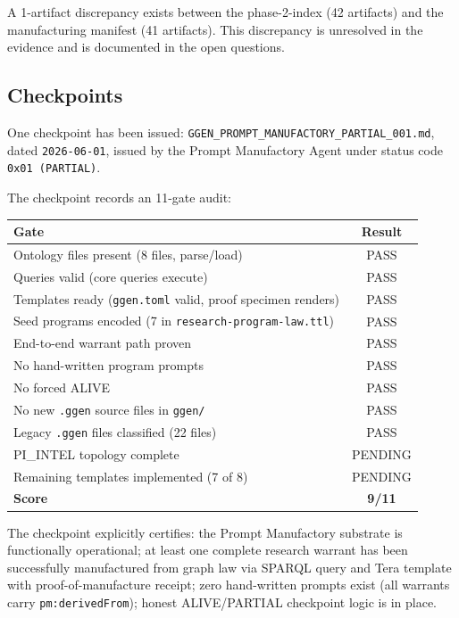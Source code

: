 A 1-artifact discrepancy exists between the phase-2-index (42 artifacts) and the
manufacturing manifest (41 artifacts). This discrepancy is unresolved in the evidence
and is documented in the open questions.

\subsection{Checkpoints}
\label{sec:research-prompt-manufactory-evidence-checkpoints}

One checkpoint has been issued: \texttt{GGEN\_PROMPT\_MANUFACTORY\_PARTIAL\_001.md},
dated \texttt{2026-06-01}, issued by the Prompt Manufactory Agent under status code
\texttt{0x01 (PARTIAL)}.

The checkpoint records an 11-gate audit:

\begin{center}
\begin{tabular}{|l|c|}
\hline
\textbf{Gate} & \textbf{Result} \\
\hline
Ontology files present (8 files, parse/load) & PASS \\
Queries valid (core queries execute) & PASS \\
Templates ready (\texttt{ggen.toml} valid, proof specimen renders) & PASS \\
Seed programs encoded (7 in \texttt{research-program-law.ttl}) & PASS \\
End-to-end warrant path proven & PASS \\
No hand-written program prompts & PASS \\
No forced ALIVE & PASS \\
No new \texttt{.ggen} source files in \texttt{ggen/} & PASS \\
Legacy \texttt{.ggen} files classified (22 files) & PASS \\
PI\_INTEL topology complete & PENDING \\
Remaining templates implemented (7 of 8) & PENDING \\
\hline
\textbf{Score} & \textbf{9/11} \\
\hline
\end{tabular}
\end{center}

The checkpoint explicitly certifies: the Prompt Manufactory substrate is functionally
operational; at least one complete research warrant has been successfully manufactured
from graph law via SPARQL query and Tera template with proof-of-manufacture receipt;
zero hand-written prompts exist (all warrants carry \texttt{pm:derivedFrom}); honest
ALIVE/PARTIAL checkpoint logic is in place.

